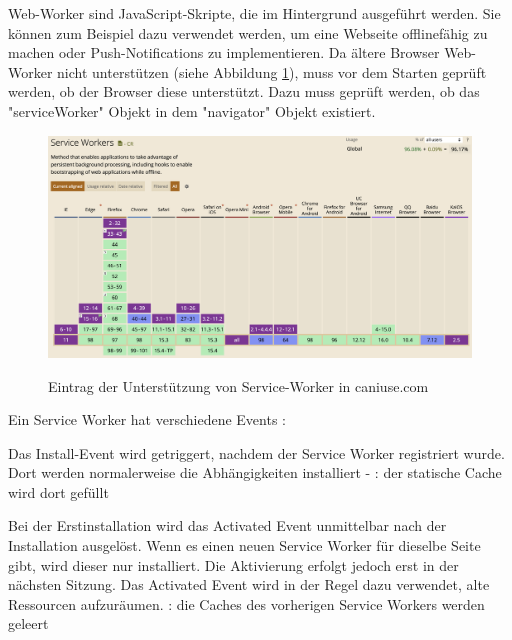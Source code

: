 

Web-Worker sind JavaScript-Skripte, die im Hintergrund ausgeführt werden. 
Sie können zum Beispiel dazu verwendet werden, um eine Webseite offlinefähig zu machen oder Push-Notifications zu implementieren.
Da ältere Browser Web-Worker nicht unterstützen (siehe Abbildung \ref{fig:CanIUseServiceWorker}), muss vor dem Starten geprüft werden, ob der Browser diese unterstützt. 
Dazu muss geprüft werden, ob das "serviceWorker" Objekt in dem "navigator" Objekt existiert. 

\begin{figure}[H]
    \centering
    \includegraphics[width=\textwidth]{media/ServiceWorker/CanIUseServiceWorker.png}
    \caption{Eintrag der Unterstützung von Service-Worker in caniuse.com}
    \cite{ciuServiceWorker}
    \label{fig:CanIUseServiceWorker}
\end{figure}


Ein Service Worker hat verschiedene Events \cite{MDNCacheAPI}: 


Das Install-Event wird getriggert, nachdem der Service Worker registriert wurde. Dort werden normalerweise die Abhängigkeiten installiert - \zb: der statische Cache wird dort gefüllt 


Bei der Erstinstallation wird das Activated Event unmittelbar nach der Installation ausgelöst. Wenn es einen neuen Service Worker für dieselbe Seite gibt, wird dieser nur installiert. Die Aktivierung erfolgt jedoch erst in der nächsten Sitzung. Das Activated Event wird in der Regel dazu verwendet, alte Ressourcen aufzuräumen. \zb: die Caches des vorherigen Service Workers werden geleert

